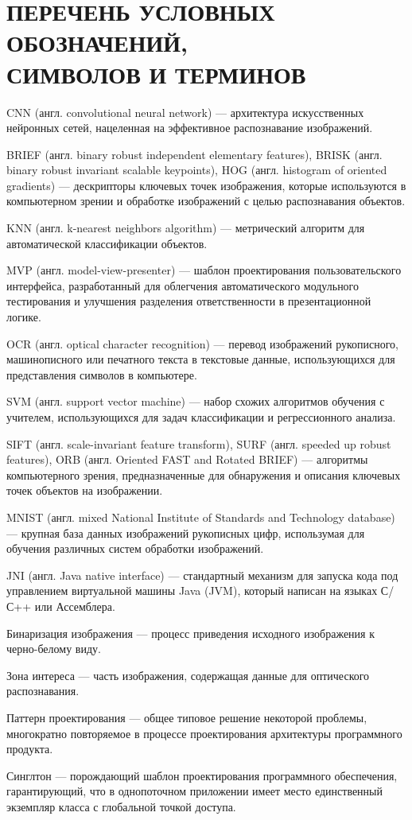 \section*{%
  ПЕРЕЧЕНЬ УСЛОВНЫХ ОБОЗНАЧЕНИЙ, \\
  СИМВОЛОВ  И ТЕРМИНОВ}

CNN (англ. convolutional neural network) ---
архитектура искусственных нейронных сетей,
нацеленная на эффективное распознавание изображений.

BRIEF (англ. binary robust independent elementary features),
BRISK (англ. binary robust invariant scalable keypoints),
HOG (англ. histogram of oriented gradients) ---
дескрипторы ключевых точек
изображения, которые используются в компьютерном зрении и обработке изображений
с целью распознавания объектов.

KNN (англ. k-nearest neighbors algorithm) --- метрический алгоритм для автоматической
классификации объектов.

MVP (англ. model-view-presenter) ---
шаблон проектирования пользовательского интерфейса, разработанный для облегчения
автоматического модульного тестирования и улучшения разделения ответственности
в презентационной логике.

OCR (англ. optical character recognition) ---
перевод изображений рукописного, машинописного или печатного текста в текстовые
данные, использующихся для представления символов в компьютере.

SVM (англ. support vector machine)
--- набор схожих алгоритмов обучения с учителем,
использующихся для задач классификации и регрессионного анализа.

SIFT (англ. scale-invariant feature transform),
SURF (англ. speeded up robust features),
ORB (англ. Oriented FAST and Rotated BRIEF)
--- алгоритмы компьютерного зрения,
предназначенные для обнаружения и описания ключевых точек объектов на изображении.

MNIST (англ. mixed National Institute of Standards and Technology database) ---
крупная база данных изображений рукописных цифр, использумая для обучения
различных систем обработки изображений.

JNI (англ. Java native interface) --- стандартный механизм для запуска кода под
управлением виртуальной машины Java (JVM), который написан на языках С/С++
или Ассемблера.

Бинаризация изображения --- процесс приведения исходного
изображения к черно-белому виду.

Зона интереса --- часть изображения, содержащая данные для оптического распознавания.

Паттерн проектирования ---
общее типовое решение некоторой проблемы,
многократно повторяемое в процессе проектирования архитектуры программного продукта.

Синглтон --- порождающий шаблон проектирования программного обеспечения,
гарантирующий, что в однопоточном приложении имеет место единственный
экземпляр класса с глобальной точкой доступа.
